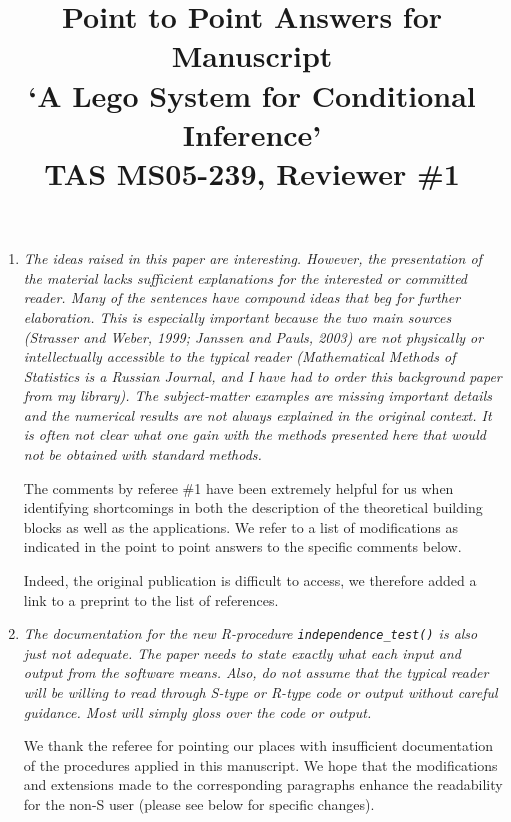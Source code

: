 \documentclass[11pt]{article}
\begin{document}
\title{Point to Point Answers for Manuscript \\
`A Lego System for Conditional Inference' \\
TAS MS05-239, Reviewer \#1}
\author{}
\maketitle

\begin{enumerate}
\item \textsl{The ideas raised in this paper are interesting. However, the presentation of the 
              material lacks sufficient explanations for the interested or committed reader. 
              Many of the sentences have compound ideas that beg for further elaboration. 
              This is especially important because the two main sources (Strasser and Weber, 1999; 
              Janssen and Pauls, 2003) are not physically or intellectually accessible to the 
              typical reader (Mathematical Methods of Statistics is a Russian Journal, and I have 
              had to order this background paper from my library). The subject-matter examples are 
              missing important details and the numerical results are not always explained in the 
              original context. It is often not clear what one gain with the methods presented here 
              that would not be obtained with standard methods.}


The comments by referee \#1 have been extremely helpful for us when
identifying shortcomings in both the description of the theoretical
building blocks as well as the applications. We refer to a list of modifications
as indicated in the point to point answers to the specific comments below.

Indeed, the original publication is difficult to access, we therefore added a link
to a preprint to the list of references.


\item \textsl{The documentation for the new R-procedure \texttt{independence\_test()} is also just not 
              adequate. The paper needs to state exactly what each input and output from the 
              software means. Also, do not assume that the typical reader will be willing to 
              read through S-type or R-type code or output without careful guidance. Most will 
              simply gloss over the code or output.}

We thank the referee for pointing our places with insufficient documentation
of the procedures applied in this manuscript. We hope that the modifications
and extensions made to the corresponding paragraphs enhance the readability
for the non-\textsf{S} user (please see below for specific
changes).


\end{enumerate}
\end{document}
